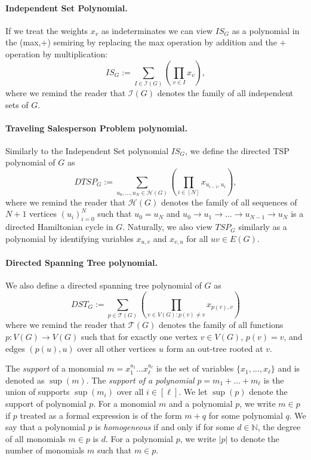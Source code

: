 \documentclass[11pt,a4paper]{article}
\begin{document}
\paragraph{Independent Set Polynomial.} If we treat the weights $x_v$ as indeterminates we can view $IS_G$ as a polynomial in the (max,+) semiring by replacing the max operation by addition and the $+$ operation by multiplication:
\begin{equation}\label{eq:mwispoly}
    IS_G := \sum_{I \in \mathcal{I}(G)} \left(\prod_{v \in I} x_v\right),
\end{equation}
where we remind the reader that $\mathcal{I}(G)$ denotes the family of all independent sets of $G$.

\paragraph{Traveling Salesperson Problem polynomial.} Similarly to the Independent Set polynomial $IS_G$, we define the directed TSP polynomial of $G$ as
$$
DTSP_G := \sum_{u_0, \dots, u_N \in \mathcal{H}(G)}
\left( \prod_{i \in [N]} x_{u_{i - 1}, u_i} \right),
$$
where we remind the reader that $\mathcal{H}(G)$ denotes the family of all sequences of $N + 1$ vertices $(u_i)_{i =0}^N$ such that $u_0 = u_N$ and $u_0 \to u_1 \to \dots \to u_{N - 1} \to u_N$ is a directed Hamiltonian cycle in $G$.
Naturally, we also view $TSP_G$ similarly as a polynomial by identifying variables $x_{u,v}$ and $x_{v, u}$ for all $uv \in E(G)$.

\paragraph{Directed Spanning Tree polynomial.} We also define a directed spanning tree polynomial of $G$ as
$$
DST_G := \sum_{p \in \mathcal{T}(G)}
\left( \prod_{v \in V(G) : p(v) \neq v} x_{p(v), v} \right)
$$
where we remind the reader that $\mathcal{T}(G)$ denotes the family of all functions $p : V(G) \to V(G)$ such that for exactly one vertex $v \in V(G)$, $p(v) = v$, and edges $(p(u), u)$ over all other vertices $u$ form an out-tree rooted at $v$.
\newline

\noindent
The \emph{support} of a monomial $m = x_1^{a_1} \dots x_\ell^{a_\ell}$ is the set of variables $\{x_1, \dots, x_\ell\}$ and is denoted as $\sup(m)$. The \emph{support of a polynomial} $p = m_1 + \dots + m_\ell$ is the union of supports $\sup(m_i)$ over all $i \in [\ell]$.
We let $\sup(p)$ denote the support of polynomial $p$.
For a monomial $m$ and a polynomial $p$, we write $m \in p$ if $p$ treated as a formal expression is of the form $m + q$ for some polynomial $q$. We say that a polynomial $p$ is \emph{homogeneous} if and only if for some $d \in \mathbb{N}$, the degree of all monomials $m \in p$ is $d$. For a polynomial $p$, we write $|p|$ to denote the number of monomials $m$ such that $m \in p$.
\end{document}

